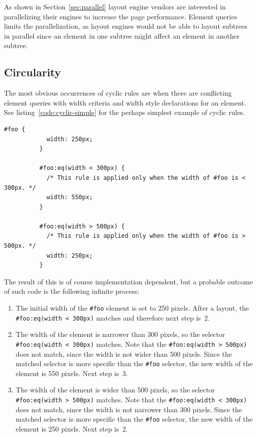 \documentclass[a4paper,11pt]{kth-mag}
\newcommand{\code}[1]{\texttt{#1}}
\begin{document}
        As shown in Section~\ref{sec:parallel} \gls{layout engine} vendors are interested in parallelizing their engines to increase the page performance.
        Element queries limits the parallelization, as \glspl{layout engine} would not be able to layout subtrees in parallel since an \gls{element} in one subtree might affect an \gls{element} in another subtree.

      \subsection{Circularity}\label{sec:cyclic-rules}
        The most obvious occurrences of cyclic rules are when there are conflicting element queries with width criteria and width style declarations for an \gls{element}.
        See listing~\ref{code:cyclic-simple} for the perhaps simplest example of cyclic rules.
        \begin{lstlisting}[gobble=10,caption={Simple example of cyclic rules with directly conflicting width element queries criteria and declarations. Recall the element queries psuedo-syntax defined in Section~\ref{sec:eq-definitions}.}, captionpos=b, label={code:cyclic-simple}]
          #foo {
            width: 250px;
          }

          #foo:eq(width < 300px) {
            /* This rule is applied only when the width of #foo is < 300px. */
            width: 550px;
          }

          #foo:eq(width > 500px) {
            /* This rule is applied only when the width of #foo is > 500px. */
            width: 250px;
          }
        \end{lstlisting}
        The result of this is of course implementation dependent, but a probable outcome of such code is the following infinite process:
        \begin{enumerate}
          \item 
            The initial width of the \code{\#foo} \gls{element} is set to 250 pixels.
            After a layout, the \code{\#foo:eq(width < 300px)} matches and therefore next step is~2.
          \item 
            The width of the \gls{element} is narrower than 300 pixels, so the selector \code{\#foo:eq(width < 300px)} matches.
            Note that the \code{\#foo:eq(width > 500px)} does not match, since the width is not wider than 500 pixels.
            Since the matched selector is more specific than the \code{\#foo} selector, the new width of the \gls{element} is 550 pixels.
            Next step is~3.
          \item 
            The width of the \gls{element} is wider than 500 pixels, so the selector \code{\#foo:eq(width > 500px)} matches.
            Note that the \code{\#foo:eq(width < 300px)} does not match, since the width is not narrower than 300 pixels.
            Since the matched selector is more specific than the \code{\#foo} selector, the new width of the \gls{element} is 250 pixels.
            Next step is~2.
        \end{enumerate}
\end{document}
